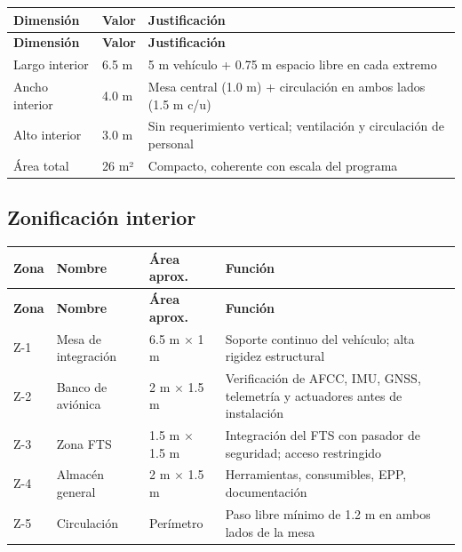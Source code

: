 \documentclass[11pt, a4paper]{article}
\begin{document}
\begin{longtable}{L{4cm} C{3cm} L{6.5cm}}
  \color{white}\textbf{Dimensión} &
  \color{white}\textbf{Valor} &
  \color{white}\textbf{Justificación} \\
  \endfirsthead
  \color{white}\textbf{Dimensión} &
  \color{white}\textbf{Valor} &
  \color{white}\textbf{Justificación} \\
  \endhead
  Largo interior & 6.5 m & 5 m vehículo + 0.75 m espacio libre en cada extremo \\
  Ancho interior & 4.0 m & Mesa central (1.0 m) + circulación en ambos lados (1.5 m c/u) \\
  Alto interior  & 3.0 m & Sin requerimiento vertical; ventilación y circulación de personal \\
  Área total     & 26 m² & Compacto, coherente con escala del programa \\
\end{longtable}

\subsection{Zonificación interior}

\begin{longtable}{C{1.2cm} L{3cm} C{2cm} L{6.5cm}}
  \color{white}\textbf{Zona} &
  \color{white}\textbf{Nombre} &
  \color{white}\textbf{Área aprox.} &
  \color{white}\textbf{Función} \\
  \endfirsthead
  \color{white}\textbf{Zona} &
  \color{white}\textbf{Nombre} &
  \color{white}\textbf{Área aprox.} &
  \color{white}\textbf{Función} \\
  \endhead
  Z-1 & Mesa de integración & 6.5 m $\times$ 1 m & Soporte continuo del vehículo; alta rigidez estructural \\
  Z-2 & Banco de aviónica   & 2 m $\times$ 1.5 m & Verificación de AFCC, IMU, GNSS, telemetría y actuadores antes de instalación \\
  Z-3 & Zona FTS            & 1.5 m $\times$ 1.5 m & Integración del FTS con pasador de seguridad; acceso restringido \\
  Z-4 & Almacén general     & 2 m $\times$ 1.5 m & Herramientas, consumibles, EPP, documentación \\
  Z-5 & Circulación         & Perímetro & Paso libre mínimo de 1.2 m en ambos lados de la mesa \\
\end{longtable}
\end{document}
